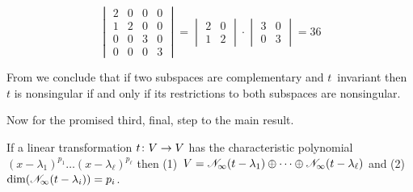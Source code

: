 \begin{example}
\begin{equation*}
    \begin{vmatrix}
       2  &0  &0  &0  \\
       1  &2  &0  &0  \\
       0  &0  &3  &0  \\
       0  &0  &0  &3
    \end{vmatrix}
   =\begin{vmatrix}
       2  &0  \\
       1  &2
    \end{vmatrix}
    \cdot
    \begin{vmatrix}
       3  &0  \\
       0  &3
    \end{vmatrix}
   =36
\end{equation*}
\end{example}

From  we conclude that
if two subspaces 
are complementary and \( t \)~invariant then
\( t \) is nonsingular if and only if its 
restrictions %
to both subspaces are nonsingular.

Now for the promised third, final, step to the main result.

\begin{lemma}
If a linear transformation \( \mbox{$t\colon V\to V$} \) has the 
characteristic polynomial
\( (x-\lambda_1)^{p_1}\dots(x-\lambda_\ell)^{p_\ell} \) then
(1)~\( V=\mathscr{N}_\infty(t-\lambda_1)\oplus\cdots
             \oplus\mathscr{N}_\infty(t-\lambda_\ell) \) 
and
(2)~\( \dim(\mathscr{N}_\infty(t-\lambda_i))=p_i  \).
\end{lemma}


